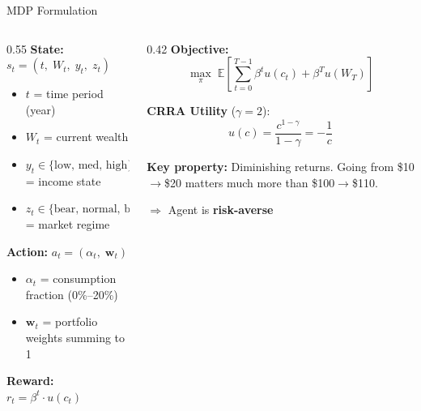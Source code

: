 \documentclass[aspectratio=169, 11pt]{beamer}
\begin{document}
\begin{frame}{MDP Formulation}
\begin{columns}[T]
\begin{column}{0.55\textwidth}
\textbf{State:} $s_t = (t,\; W_t,\; y_t,\; z_t)$
\begin{itemize}
    \item $t$ = time period (year)
    \item $W_t$ = current wealth
    \item $y_t \in \{\text{low, med, high}\}$ = income state
    \item $z_t \in \{\text{bear, normal, bull}\}$ = market regime
\end{itemize}

\vspace{0.5em}
\textbf{Action:} $a_t = (\alpha_t,\; \mathbf{w}_t)$
\begin{itemize}
    \item $\alpha_t$ = consumption fraction (0\%--20\%)
    \item $\mathbf{w}_t$ = portfolio weights summing to 1
\end{itemize}

\vspace{0.5em}
\textbf{Reward:} $r_t = \beta^t \cdot u(c_t)$
\end{column}
\begin{column}{0.42\textwidth}
\textbf{Objective:}
\[
\max_\pi \; \mathbb{E}\!\left[\sum_{t=0}^{T-1} \beta^t u(c_t) + \beta^T u(W_T)\right]
\]

\textbf{CRRA Utility} ($\gamma = 2$):
\[
u(c) = \frac{c^{1-\gamma}}{1-\gamma} = -\frac{1}{c}
\]

\vspace{0.3em}
\textbf{Key property:} Diminishing returns. Going from \$10$\to$\$20 matters much more than \$100$\to$\$110.

\vspace{0.3em}
$\Rightarrow$ Agent is \textbf{risk-averse}
\end{column}
\end{columns}
\end{frame}
\end{document}
